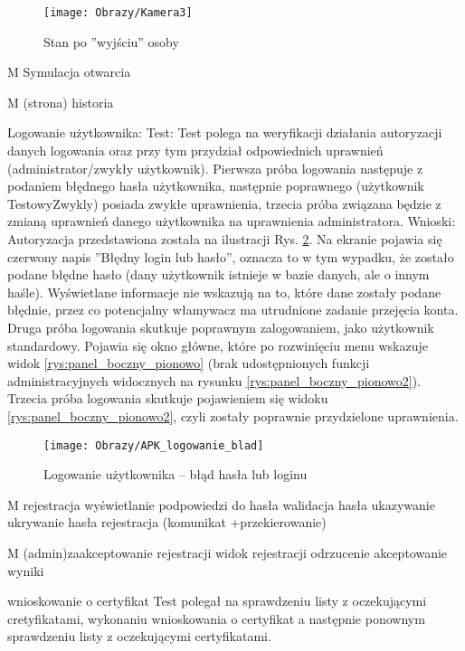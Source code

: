 \begin{enumerate*}
	\begin{figure}[ht!]
		\vspace{-1.7cm}
		\centering
		\texttt{[image: Obrazy/Kamera3]}
		\caption{Stan po ''wyjściu'' osoby}
		\label{rys:Kamera3}
	\end{figure}
\newpage
	\item M Symulacja otwarcia
	\item M (strona) historia
	\item Logowanie użytkownika: \newline
	Test: Test polega na weryfikacji działania autoryzacji danych logowania oraz przy tym przydział odpowiednich uprawnień (administrator/zwykły użytkownik). Pierwsza próba logowania następuje z podaniem błędnego hasła użytkownika, następnie poprawnego (użytkownik TestowyZwykly) posiada zwykłe uprawnienia, trzecia próba związana będzie z zmianą uprawnień danego użytkownika na uprawnienia administratora.\newline
	Wnioski: Autoryzacja przedstawiona została na ilustracji Rys. \ref{rys:Logodwanie_blad_hasla}. Na ekranie pojawia się czerwony napis ''Błędny login lub hasło'', oznacza to w tym wypadku, że zostało podane błędne hasło (dany użytkownik istnieje w bazie danych, ale o innym haśle). Wyświetlane informacje nie wskazują na to, które dane zostały podane błędnie, przez co potencjalny włamywacz ma utrudnione zadanie przejęcia konta. Druga próba logowania skutkuje poprawnym zalogowaniem, jako użytkownik standardowy. Pojawia się okno główne, które po rozwinięciu menu wskazuje widok \ref{rys:panel_boczny_pionowo} (brak udostępnionych funkcji administracyjnych widocznych na rysunku \ref{rys:panel_boczny_pionowo2}). Trzecia próba logowania skutkuje pojawieniem się widoku \ref{rys:panel_boczny_pionowo2}, czyli zostały poprawnie przydzielone uprawnienia.
	
	\begin{figure}[ht!]
		\centering
		\texttt{[image: Obrazy/APK\_logowanie\_blad]}
		\caption{Logowanie użytkownika -- błąd hasła lub loginu}
		\label{rys:Logodwanie_blad_hasla}
	\end{figure}
	\item M rejestracja
	wyświetlanie podpowiedzi do hasła
	walidacja hasła 
	ukazywanie ukrywanie hasła
	rejestracja (komunikat +przekierowanie)
	\item M (admin)zaakceptowanie rejestracji
	widok rejestracji odrzucenie 
	akceptowanie wyniki
	\item  wnioskowanie o certyfikat\newline
	Test polegał na sprawdzeniu listy z oczekującymi cretyfikatami, wykonaniu wnioskowania o certyfikat a następnie ponownym sprawdzeniu listy z oczekującymi certyfikatami.
	

\end{enumerate*}
